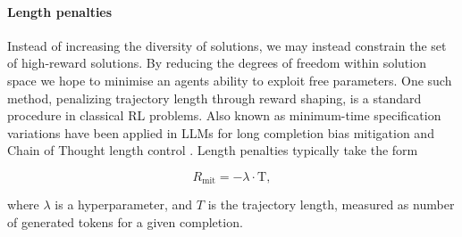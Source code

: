 

\paragraph{Length penalties}

Instead of increasing the diversity of solutions, we may instead constrain the set of high-reward solutions. By reducing the degrees of freedom within solution space we hope to minimise an agents ability to exploit free parameters. One such method, penalizing trajectory length through reward shaping, is a standard procedure in classical RL problems. Also known as minimum-time specification \cite{vasan2024revisiting} variations have been applied in LLMs for long completion bias mitigation \cite{chen2024bootstrapping} and Chain of Thought length control \cite{su2025thinking}. Length penalties typically take the form

\begin{equation} 
    R_{\mathrm{mit}} =  - \lambda\cdot\mathrm{T},
\end{equation}

where $\lambda$ is a hyperparameter, and $T$ is the trajectory length, measured as number of generated tokens for a given completion. 